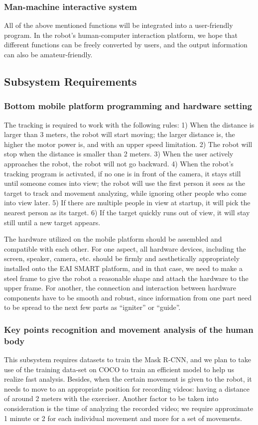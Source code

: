 \subsubsection{Man-machine interactive system}
All of the above mentioned functions will be integrated into a user-friendly program. In the robot's human-computer interaction platform, we hope that different functions can be freely converted by users, and the output information can also be amateur-friendly.




\subsection{Subsystem Requirements}
\subsubsection{Bottom mobile platform programming and hardware setting}
The tracking is required to work with the following rules: 1) When the distance is larger than 3 meters, the robot will start moving; the larger distance is, the higher the motor power is, and with an upper speed limitation. 2) The robot will stop when the distance is smaller than 2 meters. 3) When the user actively approaches the robot, the robot will not go backward. 4) When the robot’s tracking program is activated, if no one is in front of the camera, it stays still until someone comes into view; the robot will use the first person it sees as the target to track and movement analyzing, while ignoring other people who come into view later. 5) If there are multiple people in view at startup, it will pick the nearest person as its target. 6) If the target quickly runs out of view, it will stay still until a new target appears. \par
The hardware utilized on the mobile platform should be assembled and compatible with each other. For one aspect, all hardware devices, including the screen, speaker, camera, etc. should be firmly and aesthetically appropriately installed onto the EAI SMART platform, and in that case, we need to make a steel frame to give the robot a reasonable shape and attach the hardware to the upper frame. For another, the connection and interaction between hardware components have to be smooth and robust, since information from one part need to be spread to the next few parts as ``igniter” or ``guide”. 

\subsubsection{Key points recognition and movement analysis of the human body}
This subsystem requires datasets to train the Mask R-CNN, and we plan to take use of the training data-set on COCO to train an efficient model to help us realize fast analysis. Besides, when the certain movement is given to the robot, it needs to move to an appropriate position for recording videos: having a distance of around 2 meters with the exerciser. Another factor to be taken into consideration is the time of analyzing the recorded video; we require approximate 1 minute or 2 for each individual movement and more for a set of movements.


